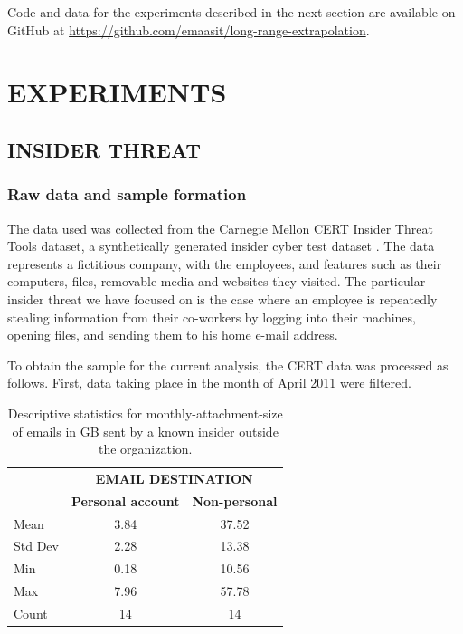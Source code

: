 \documentclass[letterpaper]{article}
\begin{document}
Code and data for the experiments described in the next section are available on GitHub at \href{https://github.com/emaasit/long-range-extrapolation}{https://github.com/emaasit/long-range-extrapolation}.

\section{EXPERIMENTS}\label{experiments}

\subsection{INSIDER THREAT}
\subsubsection{Raw data and sample formation}

The data used was collected from the Carnegie Mellon CERT Insider Threat Tools dataset, a synthetically generated insider cyber test dataset \citep{glasser2013bridging}. The data represents a fictitious company, with the employees, and features such as their computers, files, removable media and websites they visited. The particular insider threat we have focused on is the case where an employee is repeatedly stealing information from their co-workers by logging into their machines, opening files, and sending them to his home e-mail address.

To obtain the sample for the current analysis, the CERT data was processed as follows. First, data taking place in the month of April 2011 were filtered.
\lipsum[1-1]

\begin{table}[h]
\caption{Descriptive statistics for monthly-attachment-size of emails in GB sent by a known insider outside the organization.}
\label{tab:descriptive-stats-emails}
\begin{center}
\begin{tabular}{l@{\qquad}cc}
  \toprule
  \multirow{2}{*}{\raisebox{-\heavyrulewidth}{\bf STATISTIC}} & \multicolumn{2}{c}{\bf EMAIL DESTINATION} \\
  \cmidrule{2-3}
  & {\bf Personal account} & {\bf Non-personal} \\
  \midrule
  Mean & 3.84 & 37.52  \\
  Std Dev & 2.28 & 13.38  \\
  Min & 0.18 & 10.56  \\
  Max & 7.96 & 57.78  \\
  Count & 14 & 14  \\
  \bottomrule
\end{tabular}
\end{center}
\end{table}
\end{document}
